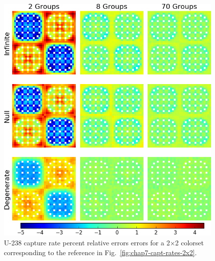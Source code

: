 \begin{appendices}
\begin{figure}[h!]
\centering
\includegraphics[width=\linewidth]{figures/quantification/appendix/2x2/capt-err}
\vspace{2mm}
\caption[U-238 capture rate errors for a 2$\times$2 periodic colorset]{U-238 capture rate percent relative errors errors for a 2$\times$2 colorset corresponding to the reference in Fig.~\ref{fig:chap7-capt-rates-2x2}.}
\label{fig:quantify-2x2-capt-err}
\end{figure}

\clearpage


\end{appendices}
